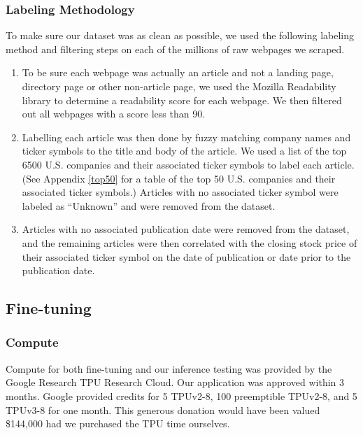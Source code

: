 \documentclass[conference]{IEEEtran}
\begin{document}
\subsubsection{Labeling Methodology}
To make sure our dataset was as clean as possible, we used the following labeling method and filtering steps on each of the millions of raw webpages we scraped.
\begin{enumerate}
    \item To be sure each webpage was actually an article and not a landing page, directory page or other non-article page, we used the Mozilla Readability library to determine a readability score for each webpage. We then filtered out all webpages with a score less than 90.
    \item Labelling each article was then done by fuzzy matching company names and ticker symbols to the title and body of the article. We used a list of the top 6500 U.S. companies and their associated ticker symbols to label each article. (See Appendix \ref{top50} for a table of the top 50 U.S. companies and their associated ticker symbols.) Articles with no associated ticker symbol were labeled as ``Unknown'' and were removed from the dataset.
    \item Articles with no associated publication date were removed from the dataset, and the remaining articles were then correlated with the closing stock price of their associated ticker symbol on the date of publication or date prior to the publication date.
\end{enumerate}
\subsection{Fine-tuning}
\subsubsection{Compute}
Compute for both fine-tuning and our inference testing was provided by the Google Research TPU Research Cloud. Our application was approved within 3 months. Google provided credits for 5 TPUv2-8, 100 preemptible TPUv2-8, and 5 TPUv3-8 for one month. This generous donation would have been valued \$144,000 had we purchased the TPU time ourselves.
\end{document}
